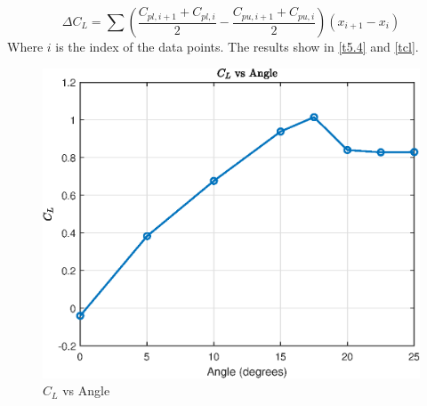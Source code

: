 $$
\Delta C_{L}=\sum\left(\frac{C_{pl,i+1}+C_{pl,i}}{2}-\frac{C_{p u ,i+1}+C_{p u ,i}}{2}\right)\left(x_{i+1}-x_{i}\right)
$$
Where $i$ is the index of the data points. The results show in \autoref{t5.4} and \autoref{tcl}.
\begin{table}[]
    \caption{Lift coefficient ($C_L$) in different angle} 
	\label{t5.4}
    \centering
    \end{table}

\begin{figure}[htb] %
        \centering
        \includegraphics[scale=0.5]{CL.eps}
        \caption{$C_L$ vs Angle}
        \label{tcl}
\end{figure}
